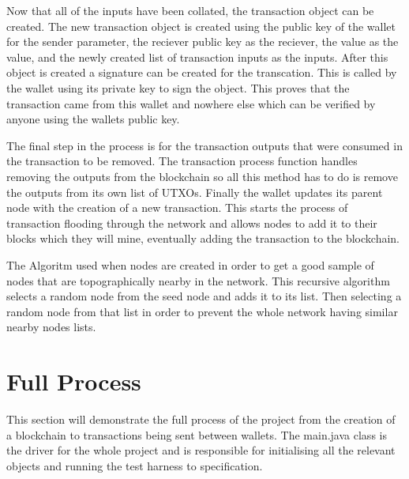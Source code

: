 \documentclass{l4proj}
\begin{document}
Now that all of the inputs have been collated, the transaction object can be created. The new transaction 
object is created using the public key of the wallet for the sender parameter, the reciever public key as the
reciever, the value as the value, and the newly created list of transaction inputs as the inputs. After this 
object is created a signature can be created for the transcation. This is called by the wallet using its private
key to sign the object. This proves that the transaction came from this wallet and nowhere else which can be 
verified by anyone using the wallets public key.

The final step in the process is for the transaction outputs that were consumed in the transaction to be removed.
The transaction process function handles removing the outputs from the blockchain so all this method has to do
is remove the outputs from its own list of UTXOs. Finally the wallet updates its parent node with the creation
of a new transaction. This starts the process of transaction flooding through the network and allows nodes to 
add it to their blocks which they will mine, eventually adding the transaction to the blockchain.

\begin{algorithm}
    \DontPrintSemicolon
    
\caption{
    The Algoritm used when nodes are created in order to get a good sample of nodes that are topographically nearby
    in the network. This recursive algorithm selects a random node from the seed node and adds it to its list. Then
    selecting a random node from that list in order to prevent the whole network having similar nearby nodes lists.
}
\label{alg:nearbyNodes}
\end{algorithm}

\section{Full Process}
This section will demonstrate the full process of the project from the creation of a blockchain to transactions
being sent between wallets. The main.java class is the driver for the whole project and is responsible for
initialising all the relevant objects and running the test harness to specification.
\end{document}
